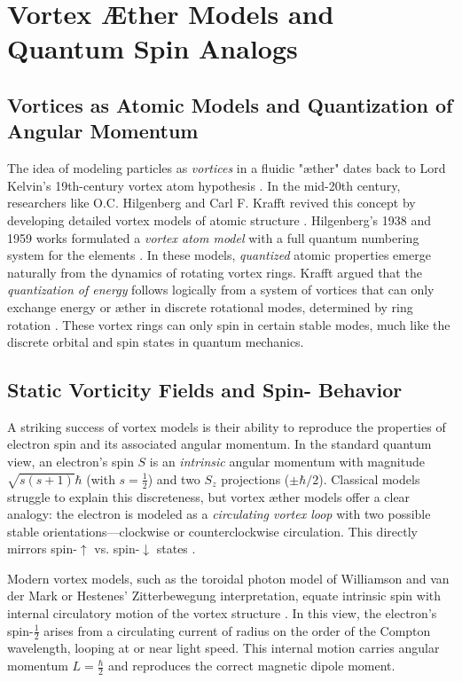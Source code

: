\chapter*{Vortex Æther Models and Quantum Spin Analogs}


\section*{Vortices as Atomic Models and Quantization of Angular Momentum}

The idea of modeling particles as \textit{vortices} in a fluidic "\ae{}ther" dates back to Lord Kelvin's 19th-century vortex atom hypothesis \cite{Dennis2020}. In the mid-20th century, researchers like O.C. Hilgenberg and Carl F. Krafft revived this concept by developing detailed vortex models of atomic structure \cite{Hilgenberg1938, KrafftEtherMatter}. Hilgenberg's 1938 and 1959 works formulated a \textit{vortex atom model} with a full quantum numbering system for the elements \cite{ReichBlackSun}. In these models, \textit{quantized} atomic properties emerge naturally from the dynamics of rotating vortex rings. Krafft argued that the \textit{quantization of energy} follows logically from a system of vortices that can only exchange energy or \ae{}ther in discrete rotational modes, determined by ring rotation \cite{PadrakINE9}. These vortex rings can only spin in certain stable modes, much like the discrete orbital and spin states in quantum mechanics.


\section*{Static Vorticity Fields and Spin-\textonehalf{} Behavior}

A striking success of vortex models is their ability to reproduce the properties of electron spin and its associated angular momentum. In the standard quantum view, an electron's spin $S$ is an \textit{intrinsic} angular momentum with magnitude $\sqrt{s(s+1)}\hbar$ (with $s=\tfrac{1}{2}$) and two $S_z$ projections ($\pm \hbar/2$). Classical models struggle to explain this discreteness, but vortex \ae{}ther models offer a clear analogy: the electron is modeled as a \textit{circulating vortex loop} with two possible stable orientations—clockwise or counterclockwise circulation. This directly mirrors spin-$\uparrow$ vs. spin-$\downarrow$ states \cite{KrafftEtherMatter}.


Modern vortex models, such as the toroidal photon model of Williamson and van der Mark or Hestenes' Zitterbewegung interpretation, equate intrinsic spin with internal circulatory motion of the vortex structure \cite{HestenesZitterbewegung}. In this view, the electron's spin-$\tfrac{1}{2}$ arises from a circulating current of radius on the order of the Compton wavelength, looping at or near light speed. This internal motion carries angular momentum $L=\tfrac{\hbar}{2}$ and reproduces the correct magnetic dipole moment.


